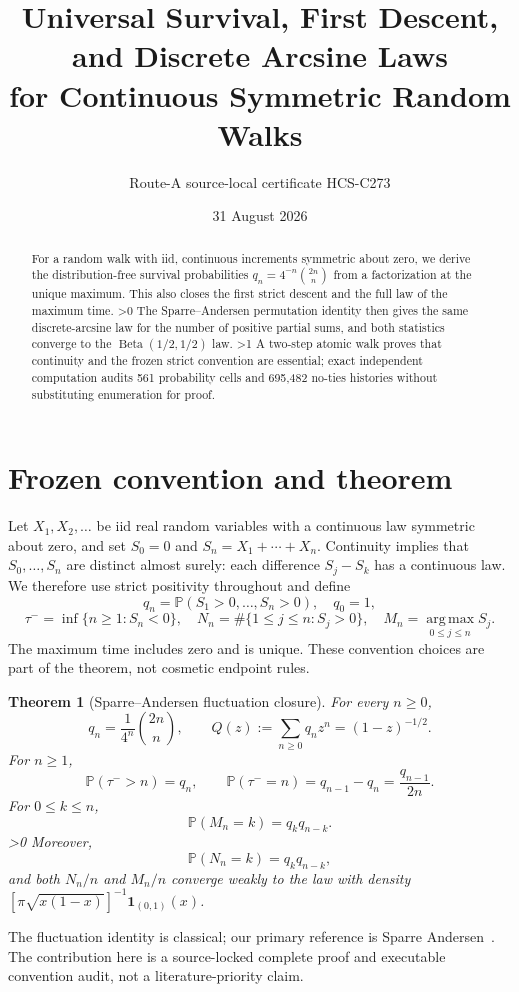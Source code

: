 \documentclass[10pt]{article}
\title{Universal Survival, First Descent, and Discrete Arcsine Laws\\
for Continuous Symmetric Random Walks}
\author{Route-A source-local certificate HCS-C273}
\date{31 August 2026}
\providecommand{\CRevisionRound}{2}
\newtheorem{theorem}{Theorem}
\newcommand{\Pp}{\mathbb P}
\newcommand{\ind}{\mathbf 1}
\begin{document}
\maketitle

\begin{abstract}
For a random walk with iid, continuous increments symmetric about zero, we
derive the distribution-free survival probabilities
$q_n=4^{-n}\binom{2n}{n}$ from a factorization at the unique maximum.
This also closes the first strict descent and the full law of the maximum time.
\ifnum\CRevisionRound>0
The Sparre--Andersen permutation identity then gives the same discrete-arcsine
law for the number of positive partial sums, and both statistics converge to
the $\operatorname{Beta}(1/2,1/2)$ law.
\fi
\ifnum\CRevisionRound>1
A two-step atomic walk proves that continuity and the frozen strict convention
are essential; exact independent computation audits 561 probability cells and
695,482 no-ties histories without substituting enumeration for proof.
\fi
\end{abstract}

\section{Frozen convention and theorem}
Let $X_1,X_2,\ldots$ be iid real random variables with a continuous law
symmetric about zero, and set $S_0=0$ and $S_n=X_1+\cdots+X_n$.  Continuity
implies that $S_0,\ldots,S_n$ are distinct almost surely: each difference
$S_j-S_k$ has a continuous law.  We therefore use strict positivity throughout
and define
\[
 q_n=\Pp(S_1>0,\ldots,S_n>0),\quad q_0=1,
\]
\[
 \tau^- =\inf\{n\ge1:S_n<0\},\quad
 N_n=\#\{1\le j\le n:S_j>0\},\quad
 M_n=\operatorname*{arg\,max}_{0\le j\le n}S_j.
\]
The maximum time includes zero and is unique.  These convention choices are
part of the theorem, not cosmetic endpoint rules.

\begin{theorem}[Sparre--Andersen fluctuation closure]\label{thm:main}
For every $n\ge0$,
\begin{equation}
 q_n=\frac{1}{4^n}\binom{2n}{n},\qquad
 Q(z):=\sum_{n\ge0}q_nz^n=(1-z)^{-1/2}.                 \tag{1}
\end{equation}
For $n\ge1$,
\begin{equation}
 \Pp(\tau^->n)=q_n,\qquad
 \Pp(\tau^-=n)=q_{n-1}-q_n=\frac{q_{n-1}}{2n}.          \tag{2}
\end{equation}
For $0\le k\le n$,
\begin{equation}
 \Pp(M_n=k)=q_kq_{n-k}.                                  \tag{3}
\end{equation}
\ifnum\CRevisionRound>0
Moreover,
\begin{equation}
 \Pp(N_n=k)=q_kq_{n-k},                                  \tag{4}
\end{equation}
and both $N_n/n$ and $M_n/n$ converge weakly to the law with density
$[\pi\sqrt{x(1-x)}]^{-1}\ind_{(0,1)}(x)$.
\fi
\end{theorem}
The fluctuation identity is classical; our primary reference is Sparre
Andersen~\cite{SA1953}.  The contribution here is a source-locked complete
proof and executable convention audit, not a literature-priority claim.
\end{document}
